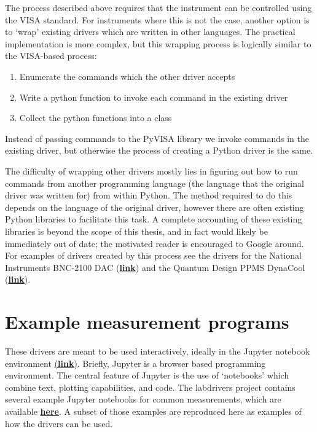 \documentclass[edeposit,fullpage,draftthesis]{uiucthesis2009}
\begin{document}
\begin{appendices}
    The process described above requires that the instrument can be controlled using the VISA standard.
    For instruments where this is not the case, another option is to `wrap' existing drivers which are
    written in other languages. The practical implementation is more complex, but this wrapping process is logically
    similar to the VISA-based process: 
    \begin{enumerate}
        \item Enumerate the commands which the other driver accepts
        \item Write a python function to invoke each command in the existing driver
        \item Collect the python functions into a class
    \end{enumerate}
    Instead of passing commands to the PyVISA library we invoke commands in the existing driver, but otherwise
    the process of creating a Python driver is the same.
    
    The difficulty of wrapping other drivers mostly lies in figuring out how to run commands from another
    programming language (the language that the original driver was written for) from within Python.
    The method required to do this depends on the language of the original driver, however there are often
    existing Python libraries to facilitate this task. A complete accounting of these existing libraries
    is beyond the scope of this thesis, and in fact would likely be immediately out of date;
    the motivated reader is encouraged to Google around. For examples
    of drivers created by this process see the drivers for the National Instruments BNC-2100 DAC
    (\href{https://github.com/masonlab/labdrivers/blob/master/labdrivers/ni/bnc2110.py}{\textbf{link}})
    and the Quantum Design PPMS DynaCool 
    (\href{https://github.com/masonlab/labdrivers/blob/master/labdrivers/quantumdesign/dynacool.py}{\textbf{link}}).
    
    
\section{Example measurement programs}

These drivers are meant to be used interactively, ideally in the Jupyter notebook environment
\href{http://jupyter.org/}{(\textbf{link})}. 
Briefly, Jupyter is a browser based programming environment. The central feature of Jupyter is the use of `notebooks' 
which combine text, plotting capabilities, and code. 
The labdrivers project contains several example Jupyter notebooks for common measurements, which are available 
\href{https://github.com/masonlab/labdrivers/tree/master/example_nbs}{\textbf{here}}.
A subset of those examples are reproduced here as examples of how the drivers can be used.


\end{appendices}
\end{document}
